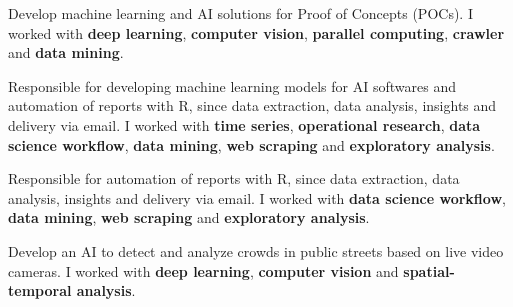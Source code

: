 \documentclass[10pt,a4paper,ragged2e,withhyper]{altacv}
\begin{document}
\begin{paracol}{2}


Develop machine learning and AI solutions for Proof of Concepts (POCs). I worked with \textbf{deep learning}, \textbf{computer vision}, \textbf{parallel computing}, \textbf{crawler} and \textbf{data mining}.

\divider

Responsible for developing machine learning models for AI softwares and automation of reports with R, since data extraction, data analysis, insights and delivery via email. I worked with \textbf{time series}, \textbf{operational research}, \textbf{data science workflow}, \textbf{data mining}, \textbf{web scraping} and \textbf{exploratory analysis}.

\divider

Responsible for automation of reports with R, since data extraction, data analysis, insights and delivery via email. I worked with \textbf{data science workflow}, \textbf{data mining}, \textbf{web scraping} and \textbf{exploratory analysis}.


Develop an AI to detect and analyze crowds in public streets based on live video cameras. I worked with \textbf{deep learning}, \textbf{computer vision} and \textbf{spatial-temporal analysis}.



\divider \smallskip


\newpage



\end{paracol}
\end{document}
